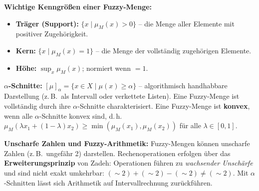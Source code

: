 

\textbf{Wichtige Kenngrößen einer Fuzzy-Menge:}
\begin{itemize}[leftmargin=1.5em]
    \item \textbf{Träger (Support):} $\{x \mid \mu_M(x) > 0\}$ -- die Menge aller Elemente mit positiver Zugehörigkeit.
    \item \textbf{Kern:} $\{x \mid \mu_M(x) = 1\}$ -- die Menge der vollständig zugehörigen Elemente.
    \item \textbf{Höhe:} $\sup_x \mu_M(x)$; normiert wenn $= 1$.
\end{itemize}

\textbf{$\alpha$-Schnitte:} $[\mu]_\alpha = \{x \in X \mid \mu(x) \geq \alpha\}$ -- algorithmisch handhabbare Darstellung (z.\,B.\ als Intervall oder verkettete Listen). Eine Fuzzy-Menge ist vollständig durch ihre $\alpha$-Schnitte charakterisiert. Eine Fuzzy-Menge ist \textbf{konvex}, wenn alle $\alpha$-Schnitte konvex sind, d.\,h.\ $\mu_M(\lambda x_1+(1-\lambda)x_2) \geq \min(\mu_M(x_1),\mu_M(x_2))$ für alle $\lambda\in[0,1]$.

\textbf{Unscharfe Zahlen und Fuzzy-Arithmetik:} Fuzzy-Mengen können unscharfe Zahlen (z.\,B.\ ungefähr 2) darstellen. Rechenoperationen erfolgen über das \textbf{Erweiterungsprinzip} von Zadeh:
Operationen führen zu \emph{wachsender Unschärfe} und sind nicht exakt umkehrbar: $(\sim\!2)+(\sim\!2)-(\sim\!2)\neq(\sim\!2)$. Mit $\alpha$-Schnitten lässt sich Arithmetik auf Intervallrechnung zurückführen.

